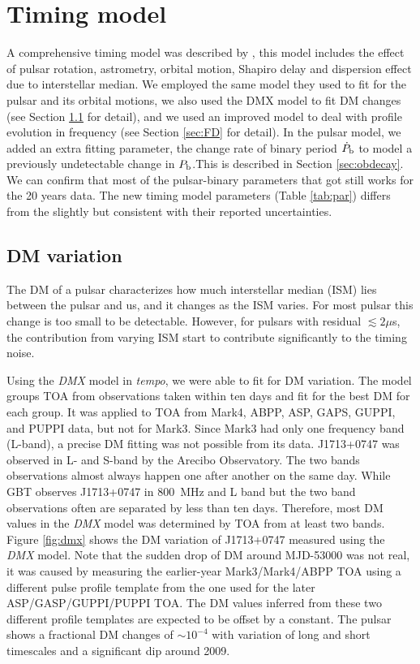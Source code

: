 \section{Timing model}
\label{sec:model}
A comprehensive timing model was described by \citet{sns+05}, this model includes the effect of pulsar rotation, astrometry, orbital motion, Shapiro delay and dispersion effect due to interstellar median.
We employed the same \citet{dd86} model they used to fit for the pulsar and
its orbital motions, we also used the DMX model to fit DM changes (see Section
\ref{sec:dmx} for detail), and we used an improved model to deal with profile
evolution in frequency (see Section \ref{sec:FD} for detail). 
In the pulsar model, we added an extra fitting parameter, the change rate of binary period $\dot{P}_{\rm b}$ to model a previously undetectable change in $P_{\rm b}$.This is described in Section \ref{sec:obdecay}.    
We can confirm that most of the pulsar-binary parameters that \citet{sns+05} got still works for the 20 years data. The new timing model parameters (Table \ref{tab:par}) differs from the \citet{sns+05} slightly but consistent with their reported uncertainties.


\subsection{DM variation}
\label{sec:dmx}
The DM of a pulsar characterizes how much interstellar median (ISM) lies
between the pulsar and us, and it changes as the ISM varies. For most pulsar
this change is too small to be detectable. However, for pulsars with residual
$\lesssim2\mu$s, the contribution from varying ISM start to contribute
significantly to the timing noise. 

Using the {\it DMX} model in {\it tempo}, we were able to fit for DM
variation. 
The model groups TOA from observations taken within ten days and fit for the
best DM for each group.   
It was applied to TOA from Mark4, ABPP, ASP, GAPS, GUPPI, and PUPPI data, but
not for Mark3. Since Mark3 had only one frequency band (L-band), a precise DM
fitting was not possible from its data.
J1713+0747 was observed in L- and S-band by the Arecibo Observatory. The
two bands observations almost always happen one after another on the same day.
While GBT observes J1713+0747 in 800~MHz and L band but the two band
observations often are separated by less than ten days.
Therefore, most DM values in the {\it DMX} model was determined by TOA from at
least two bands. Figure \ref{fig:dmx} shows the DM variation of J1713+0747 
measured using the {\it DMX} model.
Note that the sudden drop of DM around MJD-53000 was not real, it was caused
by measuring the earlier-year Mark3/Mark4/ABPP TOA using a
different pulse profile template from the one used for the later
ASP/GASP/GUPPI/PUPPI TOA. The DM values inferred from these two different profile
templates are expected to be offset by a constant.
The pulsar shows a fractional DM changes of $\sim10^{-4}$ with variation of
long and short timescales and a significant dip around 2009.



